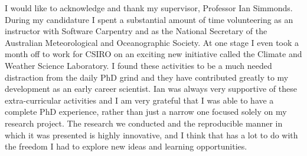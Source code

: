 
\begin{acknowledgements}

	I would like to acknowledge and thank my supervisor, Professor Ian Simmonds. During my candidature I spent a substantial amount of time volunteering as an instructor with Software Carpentry and as the National Secretary of the Australian Meteorological and Oceanographic Society. At one stage I even took a month off to work for CSIRO on an exciting new initiative called the Climate and Weather Science Laboratory. I found these activities to be a much needed distraction from the daily PhD grind and they have contributed greatly to my development as an early career scientist. Ian was always very supportive of these extra-curricular activities and I am very grateful that I was able to have a complete PhD experience, rather than just a narrow one focused solely on my research project. The research we conducted and the reproducible manner in which it was presented is highly innovative, and I think that has a lot to do with the freedom I had to explore new ideas and learning opportunities.    
	

\end{acknowledgements}
